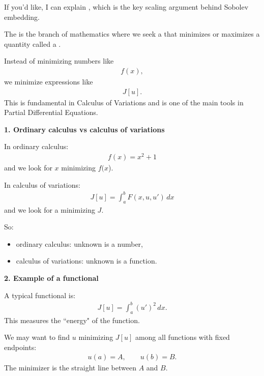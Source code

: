 \documentclass[12pt,a4paper]{report}
\begin{document}
\begin{description}
If you'd like, I can explain , which is the key scaling argument behind Sobolev embedding.

\newpage
\item {}

The  is the branch of mathematics where we seek a  that minimizes or maximizes a quantity called a .

Instead of minimizing numbers like
\begin{align*}
f(x),
\end{align*}
we minimize expressions like
\begin{align*}
J[u].
\end{align*}
This is fundamental in Calculus of Variations and is one of the main tools in Partial Differential Equations.

\item \textbf{1. Ordinary calculus vs calculus of variations}

In ordinary calculus:
\begin{align*}
f(x)=x^2+1
\end{align*}
and we look for $x$ minimizing $f(x$).

In calculus of variations:
\begin{align*}
J[u]=\int_a^b F(x,u,u')\,dx
\end{align*}
and we look for a  minimizing $J$.

So:
	\begin{itemize}
    \item ordinary calculus: unknown is a number,
    \item calculus of variations: unknown is a function.
	\end{itemize}

\item \textbf{2. Example of a functional}

A typical functional is:
\begin{align*}
J[u]=\int_a^b (u')^2\,dx.
\end{align*}
This measures the ``energy" of the function.

We may want to find $u$ minimizing $J[u]$ among all functions with fixed endpoints:
\begin{align*}
u(a)=A,\qquad u(b)=B.
\end{align*}
The minimizer is the straight line between $A$ and $B$.


\end{description}
\end{document}
